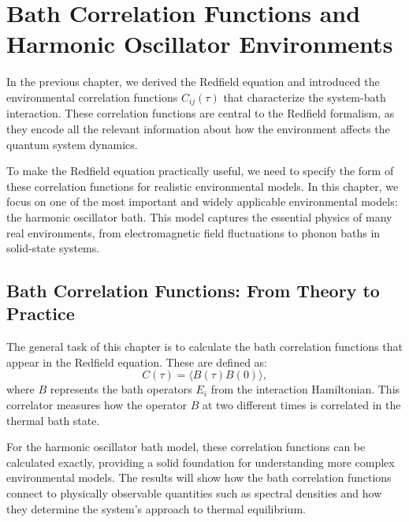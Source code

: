 \chapter{Bath Correlation Functions and Harmonic Oscillator Environments} %

\label{Chapter_bath_correlations_harmonic_oscillators} %

In the previous chapter, we derived the Redfield equation and introduced the environmental correlation functions $C_{ij}(\tau)$ that characterize the system-bath interaction. These correlation functions are central to the Redfield formalism, as they encode all the relevant information about how the environment affects the quantum system dynamics.

To make the Redfield equation practically useful, we need to specify the form of these correlation functions for realistic environmental models. In this chapter, we focus on one of the most important and widely applicable environmental models: the harmonic oscillator bath. This model captures the essential physics of many real environments, from electromagnetic field fluctuations to phonon baths in solid-state systems.


\section{Bath Correlation Functions: From Theory to Practice}
\label{sec:bath_correlator}

The general task of this chapter is to calculate the bath correlation functions that appear in the Redfield equation. These are defined as:
\begin{equation} \label{eq:bath_correlator}
	C(\tau) = \langle B(\tau) B(0) \rangle,
\end{equation}
where \( B \) represents the bath operators $E_i$ from the interaction Hamiltonian. This correlator measures how the operator \( B \) at two different times is correlated in the thermal bath state.

For the harmonic oscillator bath model, these correlation functions can be calculated exactly, providing a solid foundation for understanding more complex environmental models. The results will show how the bath correlation functions connect to physically observable quantities such as spectral densities and how they determine the system's approach to thermal equilibrium.

